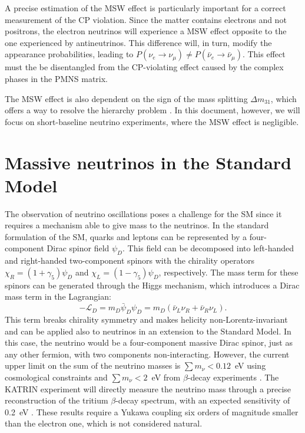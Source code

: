 A precise estimation of the MSW effect is particularly important for a correct measurement of the CP violation. Since the matter contains electrons and not positrons, the electron neutrinos will experience a MSW effect opposite to the one experienced by antineutrinos. This difference will, in turn, modify the appearance probabilities, leading to $P(\nu_{e}\rightarrow\nu_{\mu}) \neq P(\bar{\nu}_{e}\rightarrow\bar{\nu}_{\mu})$. This effect must the be disentangled from the CP-violating effect caused by the complex phases in the PMNS matrix.

The MSW effect is also dependent on the sign of the mass splitting $\Delta m_{31}$, which offers a way to resolve the hierarchy problem \cite{Smirnov:2013cqa}. 
In this document, however, we will focus on short-baseline neutrino experiments, where the MSW effect is negligible.

\section{Massive neutrinos in the Standard Model}
The observation of neutrino oscillations poses a challenge for the SM since it requires a mechanism able to give mass to the neutrinos.
In the standard formulation of the SM, quarks and leptons can be represented by a four-component Dirac spinor field $\psi_{D}$. This field can be decomposed into left-handed and right-handed two-component spinors with the chirality operators $\chi_{R} = (1+\gamma_5)\psi_D$ and $\chi_{L} = (1-\gamma_5)\psi_D$, respectively. The mass term for these spinors can be generated through the Higgs mechanism, which introduces a Dirac mass term in the Lagrangian:
\begin{equation}
    -\mathcal{L}_D = m_D\bar{\psi}_D\psi_D = m_D(\bar{\nu}_L\nu_R + \bar{\nu}_R\nu_L).
\end{equation}
This term breaks chirality symmetry and makes helicity non-Lorentz-invariant and can be applied also to neutrinos in an extension to the Standard Model. In this case, the neutrino would be a four-component massive Dirac spinor, just as any other fermion, with two components non-interacting.
However, the current upper limit on the sum of the neutrino masses is $\sum m_{\nu} < 0.12$~eV using cosmological constraints \cite{Aghanim:2018eyx} and $\sum m_{\nu} < 2$~eV from $\beta$-decay experiments \cite{Otten:2008zz}. The KATRIN experiment will directly measure the neutrino mass through a precise reconstruction of the tritium $\beta$-decay spectrum, with an expected sensitivity of 0.2~eV \cite{Osipowicz:2001sq}. These results require a Yukawa coupling six orders of magnitude smaller than the electron one, which is not considered natural. 

